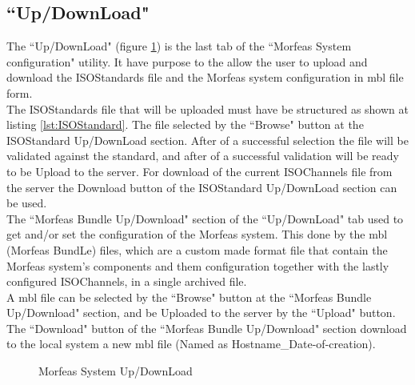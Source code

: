 \subsection{``Up/DownLoad"}
The ``Up/DownLoad" (figure \ref{fig:sys_conf_up_down}) is the last tab of the ``Morfeas System configuration" utility.
It have purpose to the allow the user to upload and download the ISOStandards file and the Morfeas system configuration in mbl file form.\\

\noindent
The ISOStandards file that will be uploaded must have be structured as shown at listing \ref{lst:ISOStandard}.
The file selected by the ``Browse" button at the ISOStandard Up/DownLoad section.
After of a successful selection the file will be validated against the standard,
and after of a successful validation will be ready to be Upload to the server.
For download of the current ISOChannels file from the server the Download button of the ISOStandard Up/DownLoad section can be used.\\

\noindent
The ``Morfeas Bundle Up/Download" section of the ``Up/DownLoad" tab used to get and/or set the configuration of the Morfeas system.
This done by the mbl (Morfeas BundLe) files, which are a custom made format file that contain the Morfeas system's components and them configuration
together with the lastly configured ISOChannels, in a single archived file.\\
A mbl file can be selected by the ``Browse" button at the ``Morfeas Bundle Up/Download" section, and be Uploaded to the server by the ``Upload" button.\\
The ``Download" button of the ``Morfeas Bundle Up/Download" section download to the local system a new mbl file (Named as Hostname\_Date-of-creation).

\begin{figure}[h]
\centering
	\caption{Morfeas System Up/DownLoad}
	\label{fig:sys_conf_up_down}
\end{figure}
